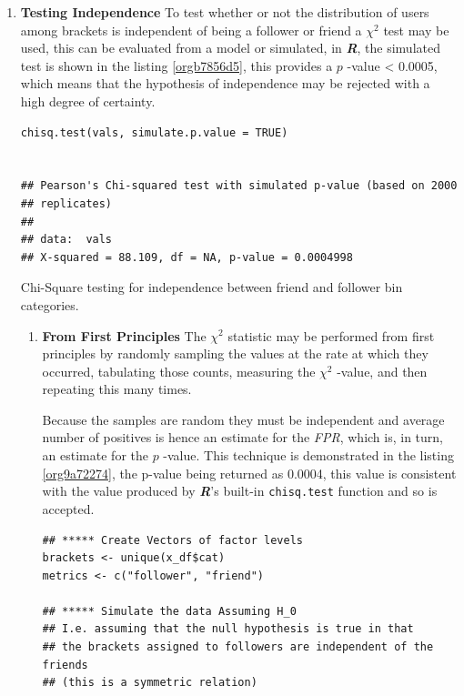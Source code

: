 \documentclass[11pt]{article}
\begin{document}
\begin{enumerate}
\item \textbf{Testing Independence}
\label{sec:orgd8e2fb6}
\newline
To test whether or not the distribution of users among brackets is
independent of being a follower or friend a \(\chi^{2}\) test may be used, this
can be evaluated from a model or simulated, in \textbf{\emph{R}}, the simulated test is
shown in the listing \ref{orgb7856d5}, this provides a \(p\) -value < 0.0005, which means that the hypothesis of independence may be rejected with a high degree of certainty.

\begin{listing}[htbp]
\begin{verbatim}
chisq.test(vals, simulate.p.value = TRUE)


## Pearson's Chi-squared test with simulated p-value (based on 2000
## replicates)
##
## data:  vals
## X-squared = 88.109, df = NA, p-value = 0.0004998
\end{verbatim}
\caption{\label{orgb7856d5}Chi-Square testing for independence between friend and follower bin categories.}
\end{listing}

\begin{enumerate}
\item \textbf{From First Principles}
\label{sec:org3ef0ff1}
\newline
The \(\chi^{2}\) statistic may be performed from first principles by randomly
sampling the values at the rate at which they occurred, tabulating those counts, measuring the \(\chi^{2}\) -value, and then repeating this many times.

Because the samples are random they must be independent and average number of
positives is hence an estimate for the \emph{FPR}, which is, in turn, an estimate for
the \(p\) -value. This technique is demonstrated in the listing \ref{org9a72274}, the p-value
being returned as 0.0004, this value is consistent with the value produced by
\textbf{\emph{R}}'s built-in \texttt{chisq.test} function and so is accepted.

\begin{listing}[htbp]
\begin{verbatim}
## ***** Create Vectors of factor levels
brackets <- unique(x_df$cat)
metrics <- c("follower", "friend")

## ***** Simulate the data Assuming H_0
## I.e. assuming that the null hypothesis is true in that
## the brackets assigned to followers are independent of the friends
## (this is a symmetric relation)


\end{verbatim}
\end{listing}
\end{enumerate}
\end{enumerate}
\end{document}
